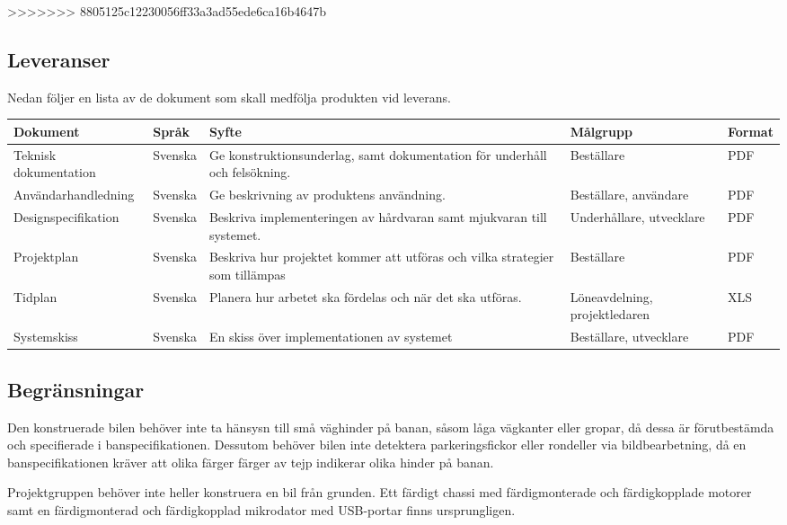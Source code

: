 \documentclass[projektplan/plan.tex]{subfiles}
\begin{document}
\begin{minipage}{\textwidth}
>>>>>>> 8805125c12230056ff33a3ad55ede6ca16b4647b
\subsection{Leveranser}
\label{sec:doc}
Nedan följer en lista av de dokument som skall medfölja produkten vid leverans.
{\renewcommand{\arraystretch}{1.6}
\begin{longtable}{p{4.5cm}p{1.5cm}p{5cm}p{2.2cm}p{1.2cm}}
    \bfseries Dokument &
    \bfseries Språk &
    \bfseries Syfte &
    \bfseries Målgrupp &
    \bfseries Format \\\hline
    Teknisk dokumentation &
    Svenska &
    Ge konstruktionsunderlag, samt dokumentation för underhåll och
    felsökning. &
    Beställare &
    PDF
    \\
    Användarhandledning &
    Svenska &
    Ge beskrivning av produktens användning. &
    Beställare, användare &
    PDF
    \\
    Designspecifikation &
    Svenska &
    Beskriva implementeringen av hårdvaran samt mjukvaran till systemet. &
    Underhållare, utvecklare &
    PDF
    \\
    Projektplan &
    Svenska &
    Beskriva hur projektet kommer att utföras och vilka strategier som
    tillämpas &
    Beställare &
    PDF
    \\
    Tidplan &
    Svenska &
    Planera hur arbetet ska fördelas och när det ska utföras. &
    Löne\-avdelning, projekt\-ledaren &
    XLS
    \\
    Systemskiss &
    Svenska &
    En skiss över implementationen av systemet &
    Beställare, utvecklare &
    PDF
    \\
    
    \endhead
\end{longtable}}
\end{minipage}

\subsection{Begränsningar}
Den konstruerade bilen behöver inte ta hänsysn till små väghinder på banan,
såsom låga vägkanter eller gropar, då dessa är förutbestämda och specifierade i
banspecifikationen. Dessutom behöver bilen inte detektera parkeringsfickor
eller rondeller via bildbearbetning, då en banspecifikationen kräver att olika
färger färger av tejp indikerar olika hinder på banan.

Projektgruppen behöver inte heller konstruera en bil från grunden. Ett färdigt
chassi med färdigmonterade och färdigkopplade motorer samt en färdigmonterad
och färdigkopplad mikrodator med USB-portar finns ursprungligen.
\end{document}
